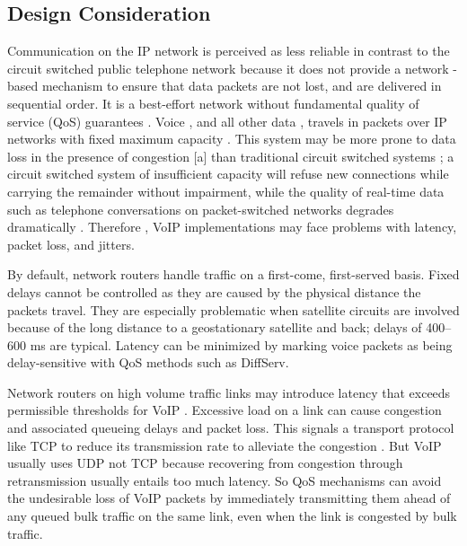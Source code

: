 \subsection{Design Consideration}
\justify \quad
Communication on the IP network is perceived as less reliable in contrast to the circuit switched public telephone network because it does not provide a network -based mechanism to ensure that data packets are not lost, and are delivered in sequential order. It is a best-effort network without fundamental quality of service (QoS) guarantees . Voice , and all other data , travels in packets over IP networks with fixed maximum capacity . This system may be more prone to data loss in the presence of congestion [a] than traditional circuit switched systems ; a circuit switched system of insufficient capacity will refuse new connections while carrying the remainder without impairment, while the quality of real-time data such as telephone conversations on packet-switched networks degrades dramatically . Therefore , VoIP implementations may face problems with latency, packet loss, and jitters.

\newline 
\justify\quad
By default, network routers handle traffic on a first-come, first-served basis. Fixed delays cannot be controlled as they are caused by the physical distance the packets travel. They are especially problematic when satellite circuits are involved because of the long distance to a geostationary satellite and back; delays of 400–600 ms are typical. Latency can be minimized by marking voice packets as being delay-sensitive with QoS methods such as DiffServ.

\newline
\justify\quad
Network routers on high volume traffic links may introduce latency that exceeds
permissible thresholds for VoIP . Excessive load on a link can cause congestion and associated queueing delays and packet loss. This signals a transport protocol like TCP to reduce its transmission rate to alleviate the congestion . But VoIP usually uses UDP not TCP because recovering from congestion through retransmission usually entails too much latency. So QoS mechanisms can avoid the undesirable loss of VoIP packets by immediately transmitting them ahead of any queued bulk traffic on the same link, even when the link is congested by bulk traffic.

\newpage